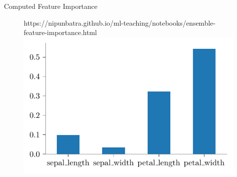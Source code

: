 \documentclass[10pt]{beamer}
\newcommand{\fitpic}[1]{\begin{adjustbox}{max width=\linewidth, max totalheight=0.78\textheight}#1\end{adjustbox}}
\begin{document}
\begin{frame}{Computed Feature Importance}
  \begin{figure}[htp]
    \centering
    \begin{notebookbox}{https://nipunbatra.github.io/ml-teaching/notebooks/ensemble-feature-importance.html}
      \fitpic{\includegraphics[scale=0.8]{../assets/ensemble/figures/feature-imp-forest.pdf}}
    \end{notebookbox}
\end{figure}
\end{frame}
\end{document}
